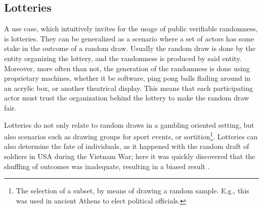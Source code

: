 \subsection{Lotteries}\label{subsec:usecase_lotteries}
A use case, which intuitively invites for the usage of public verifiable randomness, is lotteries.
They can be generalized as a scenario where a set of actors has some stake in the outcome of a random draw.
Usually the random draw is done by the entity organizing the lottery, and the randomness is produced by said entity.
Moreover, more often than not, the generation of the randomness is done using proprietary machines, whether it be software, ping pong balls flailing around in an acrylic box, or another theatrical display.
This means that each participating actor must trust the organization behind the lottery to make the random draw fair.

Lotteries do not only relate to random draws in a gambling oriented setting, but also scenarios such as drawing groups for sport events, or sortition\footnote{The selection of a subset, by means of drawing a random sample. E.g., this was used in ancient Athens to elect political officials.}.
Lotteries can also determine the fate of individuals, as it happened with the random draft of soldiers in USA during the Vietnam War; here it was quickly discovered that the shuffling of outcomes was inadequate, resulting in a biased result \cite{starr1997nonrandom}.
